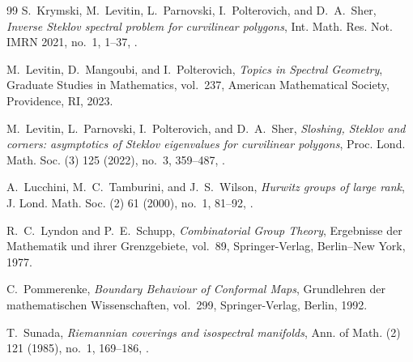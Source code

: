\documentclass[11pt,letterpaper,reqno]{amsart}
\theoremstyle{definition}
\begin{document}
\begin{thebibliography}{99}
S.~Krymski, M.~Levitin, L.~Parnovski, I.~Polterovich, and
D.~A.~Sher,
\emph{Inverse Steklov spectral problem for curvilinear polygons},
Int. Math. Res. Not. IMRN 2021, no.~1, 1--37,
.

M.~Levitin, D.~Mangoubi, and I.~Polterovich,
\emph{Topics in Spectral Geometry},
Graduate Studies in Mathematics, vol.~237,
American Mathematical Society, Providence, RI, 2023.

M.~Levitin, L.~Parnovski, I.~Polterovich, and D.~A.~Sher,
\emph{Sloshing, Steklov and corners: asymptotics of Steklov
eigenvalues for curvilinear polygons},
Proc. Lond. Math. Soc. (3) 125 (2022), no.~3, 359--487,
.

A.~Lucchini, M.~C.~Tamburini, and J.~S.~Wilson,
\emph{Hurwitz groups of large rank},
J. Lond. Math. Soc. (2) 61 (2000), no.~1, 81--92,
.

R.~C.~Lyndon and P.~E.~Schupp,
\emph{Combinatorial Group Theory},
Ergebnisse der Mathematik und ihrer Grenzgebiete, vol.~89,
Springer-Verlag, Berlin--New York, 1977.

C.~Pommerenke,
\emph{Boundary Behaviour of Conformal Maps},
Grundlehren der mathematischen Wissenschaften, vol.~299,
Springer-Verlag, Berlin, 1992.

T.~Sunada,
\emph{Riemannian coverings and isospectral manifolds},
Ann. of Math. (2) 121 (1985), no.~1, 169--186,
.

\end{thebibliography}
\end{document}
